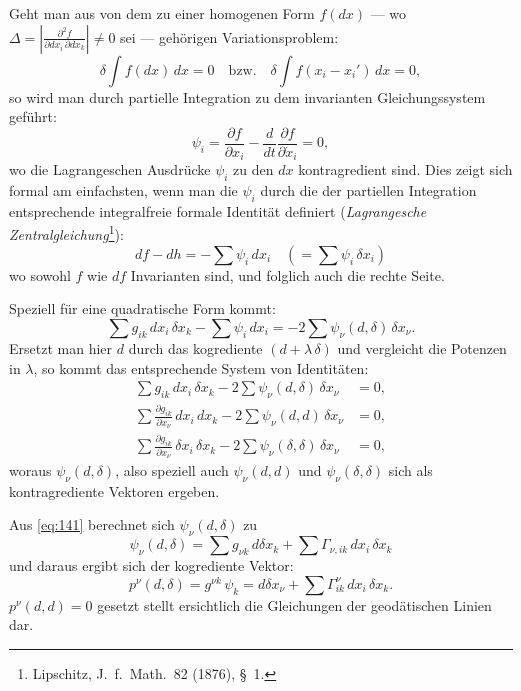\documentclass[fontsize=10pt,paper=a5,pagesize,headings=small]{scrbook}
\theoremstyle{plain}
\begin{document}
Geht man aus von dem zu einer homogenen Form $f(dx)$ --- wo
$\Delta = \left|\frac{\partial^2 f}{\partial dx_i\,\partial dx_k}\right| \neq 0$ sei --- gehörigen Variationsproblem:
\begin{equation}
\label{eq:var140}
\delta \int f(dx)\,dx = 0 \quad \text{bzw.}\quad \delta \int f(x_i - x_i')\,dx = 0,
\end{equation}
so wird man durch partielle Integration zu dem invarianten Gleichungssystem
geführt:
\[ \psi_i = \frac{\partial f}{\partial x_i} - \frac{d}{dt}\frac{\partial f}{\partial \dot{x}_i} = 0, \]
wo die Lagrangeschen Ausdrücke $\psi_i$ zu den $dx$ kontragredient sind.
Dies zeigt sich formal am einfachsten, wenn man die $\psi_i$ durch die der
partiellen Integration entsprechende integralfreie formale Identität definiert
(\textit{Lagrangesche Zentralgleichung}\footnote{Lipschitz, J.~f.\ Math.\ 82 (1876), \S~1.}):
\[ df - dh = -\sum \psi_i\,dx_i \quad (= \sum \psi_i\,\delta x_i) \]
wo sowohl $f$ wie $df$ Invarianten sind, und folglich auch die rechte Seite.

Speziell für eine quadratische Form kommt:
\[ \sum g_{ik}\,dx_i\,\delta x_k - \sum \psi_i\,dx_i = -2\sum \psi_\nu(d,\delta)\,\delta x_\nu. \]
Ersetzt man hier $d$ durch das kogrediente $(d + \lambda\,\delta)$ und vergleicht die
Potenzen in $\lambda$, so kommt das entsprechende System von Identitäten:
\begin{equation}
\label{eq:141}
\begin{aligned}
\sum g_{ik}\,dx_i\,\delta x_k - 2\sum \psi_\nu(d,\delta)\,\delta x_\nu &= 0,\\
\sum \frac{\partial g_{ik}}{\partial x_\nu}\,dx_i\,dx_k - 2\sum \psi_\nu(d,d)\,\delta x_\nu &= 0,\\
\sum \frac{\partial g_{ik}}{\partial x_\nu}\,\delta x_i\,\delta x_k - 2\sum \psi_\nu(\delta,\delta)\,\delta x_\nu &= 0,
\end{aligned}
\end{equation}
woraus $\psi_\nu(d,\delta)$, also speziell auch $\psi_\nu(d,d)$ und $\psi_\nu(\delta,\delta)$
sich als kontragrediente Vektoren ergeben.

Aus \eqref{eq:141} berechnet sich $\psi_\nu(d,\delta)$ zu
\[ \psi_\nu(d,\delta) = \sum g_{\nu k}\,d\delta x_k + \sum \Gamma_{\nu,ik}\,dx_i\,\delta x_k \]
und daraus ergibt sich der kogrediente Vektor:
\begin{equation}
\label{eq:142}
p^\nu(d,\delta) = g^{\nu k}\,\psi_k = d\delta x_\nu + \sum \Gamma_{ik}^{\nu}\,dx_i\,\delta x_k.
\end{equation}
$p^\nu(d,d) = 0$ gesetzt stellt ersichtlich die Gleichungen der geodätischen
Linien dar.
\end{document}
